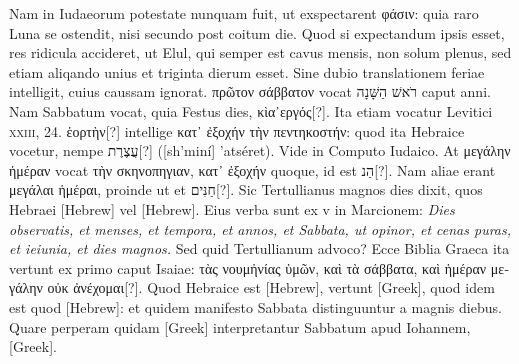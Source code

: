 Nam in Iudaeorum potestate
nunquam fuit, ut exspectarent \textgreek{φάσιν}:
 quia raro Luna se ostendit,
nisi secundo post coitum die.
Quod si expectandum ipsis esset,
res ridicula accideret, ut Elul, qui semper est cavus mensis, non solum
plenus, sed etiam aliqando unius et triginta dierum esset.
Sine dubio translationem feriae intelligit, cuius caussam ignorat.
\textgreek{πρῶτον σάββατον} vocat
 \texthebrew{רֹאשׁ הַשָּׁנָה‎}
 caput anni.
Nam Sabbatum vocat, quia Festus
dies, \textgreek{κὶα᾽εργός}[?].
Ita etiam vocatur Levitici \textsc{xxiii}, 24.
\textgreek{ἑορτὴν}[?]
 intellige
\textgreek{κατ᾽ ἐξοχήν τὴν πεντηκοστήν}:
 quod ita Hebraice vocetur, nempe \texthebrew{עֲצֶרֶת}[?] ([sh'miní] 'atséret).
Vide in Computo Iudaico.
At \textgreek{μεγάλην ἡμέραν}
 vocat \textgreek{τὴν σκηνοπηγιαν, κατ᾽ ἐξοχήν}
 quoque, id est \texthebrew{הַנ}[?].
Nam aliae erant \textgreek{μεγάλαι ἡμέραι},
proinde ut et \texthebrew{חַנִּים}[?].
Sic Tertullianus magnos dies dixit, quos
Hebraei \texthebrew{[Hebrew]} vel \texthebrew{[Hebrew]}.
Eius verba sunt ex v in Marcionem:
\textit{Dies observatis, et menses, et tempora, et annos, et Sabbata, ut opinor,
et cenas puras, et ieiunia, et dies magnos.}
Sed quid Tertullianum
advoco?
Ecce Biblia Graeca ita vertunt ex primo caput Isaiae:
\textgreek{τὰς νουμἠνίας ὑμῶν, καὶ τὰ σάββατα,
 καὶ ἡμέραν μεγάλην οὐκ ἀνέχομαι}[?].
Quod Hebraice est \texthebrew{[Hebrew]},
 vertunt \textgreek{[Greek]}, quod idem
est quod \texthebrew{[Hebrew]}: et quidem manifesto Sabbata distinguuntur a
magnis diebus. 
Quare perperam quidam \textgreek{[Greek]} interpretantur
Sabbatum apud Iohannem, \textgreek{[Greek]}.
